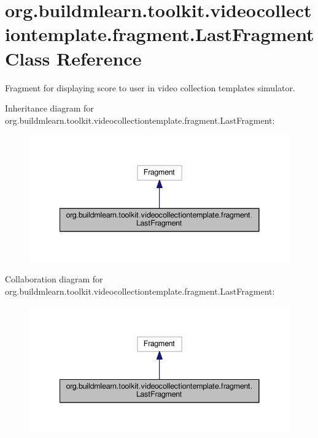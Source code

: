 \hypertarget{classorg_1_1buildmlearn_1_1toolkit_1_1videocollectiontemplate_1_1fragment_1_1LastFragment}{}\section{org.\+buildmlearn.\+toolkit.\+videocollectiontemplate.\+fragment.\+Last\+Fragment Class Reference}
\label{classorg_1_1buildmlearn_1_1toolkit_1_1videocollectiontemplate_1_1fragment_1_1LastFragment}


Fragment for displaying score to user in video collection template\textquotesingle{}s simulator.  




Inheritance diagram for org.\+buildmlearn.\+toolkit.\+videocollectiontemplate.\+fragment.\+Last\+Fragment\+:
\nopagebreak
\begin{figure}[H]
\begin{center}
\leavevmode
\includegraphics[width=341pt]{classorg_1_1buildmlearn_1_1toolkit_1_1videocollectiontemplate_1_1fragment_1_1LastFragment__inherit__graph}
\end{center}
\end{figure}


Collaboration diagram for org.\+buildmlearn.\+toolkit.\+videocollectiontemplate.\+fragment.\+Last\+Fragment\+:
\nopagebreak
\begin{figure}[H]
\begin{center}
\leavevmode
\includegraphics[width=341pt]{classorg_1_1buildmlearn_1_1toolkit_1_1videocollectiontemplate_1_1fragment_1_1LastFragment__coll__graph}
\end{center}
\end{figure}

